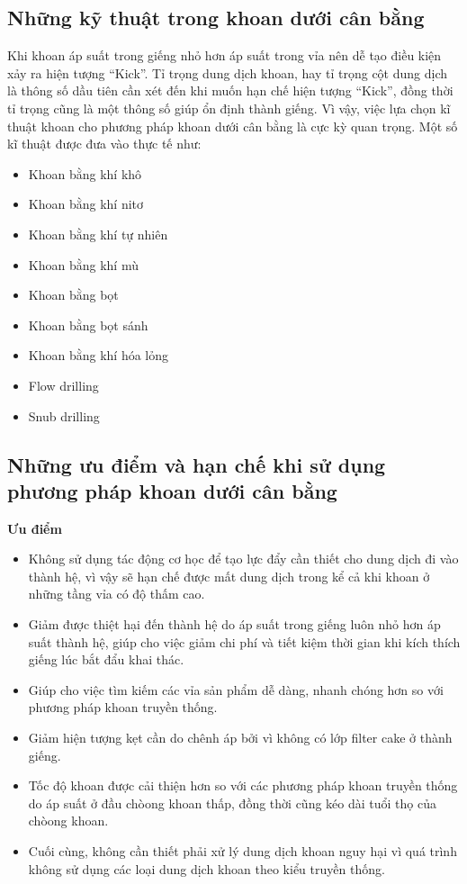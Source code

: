 \documentclass[12pt,a4paper]{article}
\begin{document}
\subsection{Những kỹ thuật trong khoan dưới cân bằng}
	Khi khoan áp suất trong giếng nhỏ hơn áp suất trong vỉa nên dễ tạo điều kiện xảy ra hiện tượng “Kick”. Tỉ trọng dung dịch khoan, hay tỉ trọng cột dung dịch là thông số dầu tiên cần xét đến khi muốn hạn chế hiện tượng “Kick”, đồng thời tỉ trọng cũng là một thông số giúp ổn định thành giếng. Vì vậy, việc lựa chọn kĩ thuật khoan cho phương pháp khoan dưới cân bằng là cực kỳ quan trọng. Một số kĩ thuật được đưa vào thực tế như:
	\begin{itemize}
		\item Khoan bằng khí khô
		\item Khoan bằng khí nitơ
		\item Khoan bằng khí tự nhiên 
		\item Khoan bằng khí mù
		\item Khoan bằng bọt
		\item Khoan bằng bọt sánh
		\item Khoan bằng khí hóa lỏng
		\item Flow drilling
		\item Snub drilling
	\end{itemize}
\subsection{Những ưu điểm và hạn chế khi sử dụng phương pháp khoan dưới cân bằng}
	\textbf{Ưu điểm}
	\begin{itemize}
	\item Không sử dụng tác động cơ học để tạo lực đẩy cần thiết cho dung dịch đi vào thành hệ, vì vậy sẽ hạn chế được mất dung dịch trong kể cả khi khoan ở những tầng vỉa có độ thấm cao.
	\item Giảm được thiệt hại đến thành hệ do áp suất trong giếng luôn nhỏ hơn áp suất thành hệ, giúp cho việc giảm chi phí và tiết kiệm thời gian khi kích thích giếng lúc bắt đẩu khai thác. 
	\item Giúp cho việc tìm kiếm các vỉa sản phẩm dễ dàng, nhanh chóng hơn so với phương pháp khoan truyền thống.
	\item Giảm hiện tượng kẹt cần do chênh áp bởi vì không có lớp filter cake ở thành giếng.
	\item Tốc độ khoan được cải thiện hơn so với các phương pháp khoan truyền thống do áp suất ở đầu chòong khoan thấp, đồng thời cũng kéo dài tuổi thọ của chòong khoan.
	\item Cuối cùng, không cần thiết phải xử lý dung dịch khoan nguy hại vì quá trình không sử dụng các loại dung dịch khoan theo kiểu truyền thống.
	\end{itemize}
	
\end{document}
